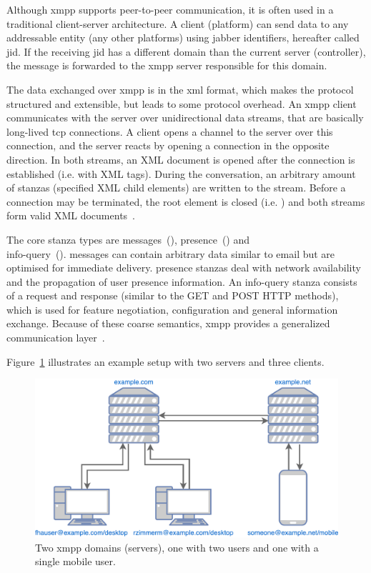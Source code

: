 Although \gls{xmpp} supports peer-to-peer communication, it is often used in a traditional client-server architecture.
A client (\gls{platform}) can send data to any addressable entity (any other \glspl{platform}) using \Gls{jabber} identifiers, hereafter called \gls{jid}.
If the receiving \gls{jid} has a different domain than the current server (\gls{controller}), the message is forwarded to the \gls{xmpp} server responsible for this domain.~\cite{rfc6120}

The data exchanged over \gls{xmpp} is in the \gls{xml} format, which makes the protocol structured and extensible, but leads to some protocol overhead.
An \gls{xmpp} client communicates with the server over unidirectional data streams, that are basically long-lived \gls{tcp} connections.
A client opens a channel to the server over this connection, and the server reacts by opening a connection in the opposite direction.
In both streams, an XML document is opened after the connection is established (i.e. with  XML tags).
During the conversation, an arbitrary amount of \glspl{stanza} (specified XML child elements) are written to the stream.
Before a connection may be terminated, the root element is closed (i.e. ) and both streams form valid XML documents~\cite{rfc6120}\cite{professional-xmpp}.

The core \gls{stanza} types are \glspl{message}~(), \gls{presence}~() and\\
\gls{info-query}~().
\Glspl{message} can contain arbitrary data similar to email but are optimised for immediate delivery.
\Gls{presence} \glspl{stanza} deal with network availability and the propagation of user presence information.
An \gls{info-query} \gls{stanza} consists of a request and response (similar to the GET and POST HTTP methods), which is used for feature negotiation, configuration and general information exchange.
Because of these coarse semantics, \gls{xmpp} provides a generalized communication layer~\cite{rfc6120}\cite{ieee-xplore-stream-xml-xmpp}.

Figure~\ref{fig:xmpp-overview} illustrates an example setup with two servers and three clients.

\begin{figure}[h]
	\centering
	\includegraphics[width=0.8\linewidth]{resources/xmpp_overview.pdf}
	\caption[XMPP example overview]{Two \gls{xmpp} domains (servers), one with two users and one with a single mobile user.}
	\label{fig:xmpp-overview}
\end{figure}


